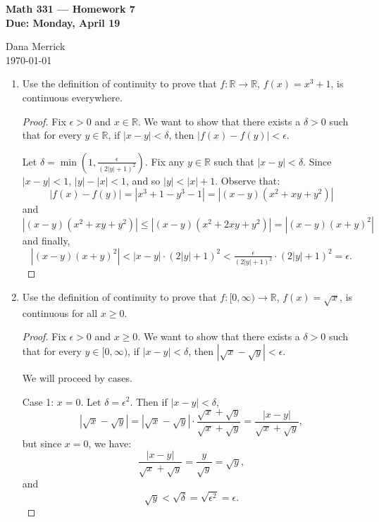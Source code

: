 \documentclass[12pt]{amsart}
\begin{document}
\thispagestyle{empty}

\begin{center}
{\bf Math 331  --- Homework 7 \\
Due:  Monday, April 19}
\end{center}

\bigskip

\noindent
Dana Merrick \\
\today

\bigskip

\begin{enumerate}

\setlength{\itemsep}{6pt}

\item Use the definition of continuity to prove that $f : \mathbb{R} \rightarrow \mathbb{R}$, $f(x)=x^3+1$, is continuous everywhere.

\begin{proof}
Fix $\epsilon >0$ and $x\in\mathbb R$. We want to show that there exists a $\delta > 0$ such that for every $y \in\mathbb R$, if $|x-y| < \delta$, then $| f(x) - f(y) | < \epsilon$.

Let $\delta = \min(1, \tfrac \epsilon {(2|y|+1)^2})$. Fix any $y\in\mathbb R$ such that $|x-y| < \delta$. Since $|x-y| < 1$, $|y| - |x| < 1$, and so $|y| < |x|+1$. Observe that:
%
\[ | f(x) - f(y) | = | x^3 + 1 - y^3 - 1 | = | (x-y) (x^2 + xy + y^2)| \]
%
and
%
\[ | (x-y) (x^2 + xy + y^2)| \le | (x-y) (x^2 + 2xy + y^2)| = | (x-y)(x+y)^2 | \]
%
and finally,
%
\[  | (x-y)(x+y)^2 | < |x-y| \cdot (2|y| +1)^2 < \tfrac \epsilon {(2|y|+1)^2}\cdot (2|y| +1)^2 = \epsilon. \]
\end{proof}

\item Use the definition of continuity to prove that $f : [0,\infty) \rightarrow \mathbb{R}$, $f(x)=\sqrt{x}$, is continuous for all $x\geq 0$.
%

\begin{proof}
Fix $\epsilon >0$ and $x \ge 0$. We want to show that there exists a $\delta > 0$ such that for every $y \in [0,\infty)$, if $|x-y| < \delta$, then $| \sqrt x - \sqrt y | < \epsilon$.

We will proceed by cases.

Case 1: $x=0$. Let $\delta = \epsilon^2$. Then if $|x-y| < \delta$,
%
\[ | \sqrt x - \sqrt y | = | \sqrt x - \sqrt y | \cdot \frac {\sqrt x + \sqrt y }{ \sqrt x + \sqrt y } = \frac {|x-y|}{ \sqrt x + \sqrt y},  \]
%
but since $x=0$, we have:
%
\[ \frac {|x-y|}{ \sqrt x + \sqrt y} = \frac y {\sqrt y} = \sqrt y, \]
%
and
%
\[ \sqrt y < \sqrt \delta = \sqrt{\epsilon^2} = \epsilon. \]


\end{proof}
\end{enumerate}
\end{document}
